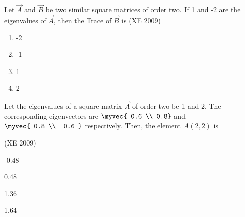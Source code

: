     \item Let $\vec{A}$ and $\vec{B}$ be two similar square matrices of order two. If 1 and -2 are the eigenvalues of $\vec{A}$, then the Trace of $\vec{B}$ is \hfill(XE 2009)
    \begin{multicols}{4}
  \begin{enumerate}
      \item -2
       \item -1
       \item 1
        \item 2
  \end{enumerate}      
    \end{multicols}

    \item Let the eigenvalues of a square matrix $\vec{A}$ of order two be 1 and 2. The corresponding eigenvectors are $
        \myvec{ 0.6 \\ 0.8}$  and  $\myvec{ 0.8 \\ -0.6 }
$ respectively. Then, the element $A(2,2)$ is 

\hfill(XE 2009)
    \begin{enumerate}
    \begin{multicols}{4}
      \item -0.48
       \item 0.48
       \item 1.36
        \item 1.64
       \end{multicols} 
  \end{enumerate}      
    
